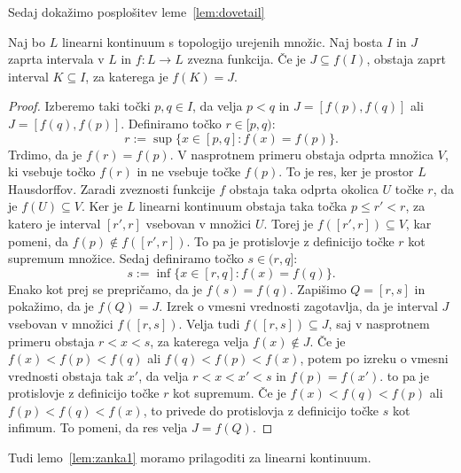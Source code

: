 \documentclass[../TG_magistrsko_delo_sections.tex]{subfiles}
\begin{document}
Sedaj dokažimo posplošitev leme~\ref{lem:dovetail}

\begin{lema}\label{lem:K}
Naj bo $L$ linearni kontinuum s topologijo urejenih množic. Naj bosta $I$ in $J$ zaprta intervala v $L$ in $f:L \to L$ zvezna funkcija. Če je $J \subseteq f(I)$, obstaja zaprt interval $K \subseteq I$, za katerega je $f(K) = J$.
\end{lema}
\begin{proof}
Izberemo taki točki $p, q \in I$, da velja $p<q$ in $J=[f(p), f(q)]$ ali $J=[f(q), f(p)]$. Definiramo točko $r \in [p, q)$:
$$r:= \sup\{x \in [p, q] : f(x) = f(p)\}.$$
Trdimo, da je $f(r) = f(p)$. V nasprotnem primeru obstaja odprta množica $V$, ki vsebuje točko $f(r)$ in ne vsebuje točke $f(p)$. To je res, ker je prostor $L$ Hausdorffov. Zaradi zveznosti funkcije $f$ obstaja taka odprta okolica $U$ točke $r$, da je $f(U) \subseteq V$. Ker je $L$ linearni kontinuum obstaja taka točka $p \leq r' < r$, za katero je interval $[r', r]$ vsebovan v množici $U$. Torej je $f([r', r]) \subseteq V$, kar pomeni, da $f(p) \notin f([r', r])$. To pa je protislovje z definicijo točke $r$ kot supremum množice.
Sedaj definiramo točko $s \in (r, q]$:
$$s:= \inf\{x \in [r, q] : f(x) = f(q)\}.$$ 
Enako kot prej se prepričamo, da je $f(s) = f(q)$. Zapišimo $Q = [r, s]$ in pokažimo, da je $f(Q) = J$. Izrek o vmesni vrednosti zagotavlja, da je interval $J$ vsebovan v množici $f([r, s])$. Velja tudi $f([r, s]) \subseteq J$, saj v nasprotnem primeru obstaja $r<x<s$, za katerega velja $f(x) \notin J$. Če je $f(x) < f(p) < f(q)$ ali $f(q) < f(p) < f(x)$, potem po izreku o vmesni vrednosti obstaja tak $x'$, da velja $r<x<x'<s$ in $f(p) = f(x')$. to pa je protislovje z definicijo točke $r$ kot supremum. Če je $f(x) < f(q) < f(p)$ ali $f(p) < f(q) < f(x)$, to privede do protislovja z definicijo točke $s$ kot infimum. To pomeni, da res velja $J = f(Q)$.
\end{proof}

Tudi lemo~\ref{lem:zanka1} moramo prilagoditi za linearni kontinuum.
\end{document}
